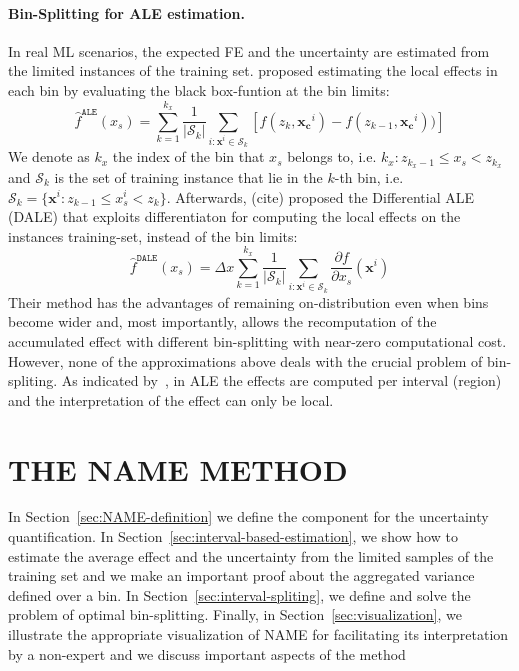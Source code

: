 \documentclass[twoside]{article}
\newcommand{\xc}{\mathbf{x_c}}
\newcommand{\xb}{\mathbf{x}}
\begin{document}
\paragraph{Bin-Splitting for ALE estimation.}

In real ML scenarios, the expected FE and the uncertainty are
estimated from the limited instances of the training set.
\citep{apley2020visualizing} proposed estimating the local effects in
each bin by evaluating the black box-funtion at the bin limits:
\begin{equation}
  \label{eq:ALE_accumulated_mean_est}
  \hat{f}^{\mathtt{ALE}}(x_s) = \sum_{k=1}^{k_x} \frac{1}{|\mathcal{S}_k|} \sum_{i:\mathbf{x}^i \in
    \mathcal{S}_k} \left [ f(z_{k}, \xc^i) - f(z_{k-1}, \xc^i)) \right ]
\end{equation}
We denote as \(k_x\) the index of the bin that \(x_s\) belongs to,
i.e. \(k_x: z_{k_x-1} \leq x_s < z_{k_x} \) and \(\mathcal{S}_k\) is
the set of training instance that lie in the \(k\)-th bin, i.e.
\( \mathcal{S}_k = \{ \xb^i : z_{k-1} \leq x^i_s < z_{k} \}
\). Afterwards, (cite) proposed the Differential ALE (DALE) that
exploits differentiaton for computing the local effects on the instances
training-set, instead of the bin limits:
\begin{equation}
  \label{eq:DALE_accumulated_mean_est}
  \hat{f}^{\mathtt{DALE}}(x_s) = \Delta x \sum_{k=1}^{k_x} \frac{1}{|\mathcal{S}_k|} \sum_{i:\mathbf{x}^i \in
    \mathcal{S}_k} \frac{\partial f}{\partial x_s}(\mathbf{x}^i)
\end{equation}
%
Their method has the advantages of remaining on-distribution even when
bins become wider and, most importantly, allows the recomputation of
the accumulated effect with different bin-splitting with near-zero
computational cost. However, none of the approximations above deals
with the crucial problem of bin-spliting. As indicated
by~\citep{molnar2022}, in ALE the effects are computed per interval
(region) and the interpretation of the effect can only be
local.


\section{THE NAME METHOD}
\label{sec:NAME-method}

In Section~\ref{sec:NAME-definition} we define the component for the
uncertainty quantification. In
Section~\ref{sec:interval-based-estimation}, we show how to estimate
the average effect and the uncertainty from the limited samples of the
training set and we make an important proof about the aggregated
variance defined over a bin. In Section~\ref{sec:interval-spliting},
we define and solve the problem of optimal bin-splitting. Finally, in
Section~\ref{sec:visualization}, we illustrate the appropriate
visualization of NAME for facilitating its interpretation by a
non-expert and we discuss important aspects of the method
\end{document}
